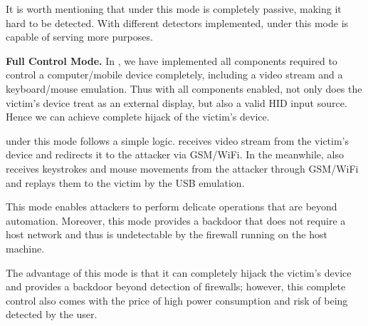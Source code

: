It is worth mentioning that \tool under this mode is completely passive, making
it hard to be detected. With different detectors implemented, \tool
under this mode is capable of serving more purposes.

\textbf{Full Control Mode.} In \tool, we have implemented all components
required to control a computer/mobile device completely, including a video stream
and a keyboard/mouse emulation. Thus with all components enabled, not only does
the victim's device treat \tool as an external display, but also a valid \ac{HID}
input source. Hence we can achieve complete hijack of the victim's device.

\tool under this mode follows a simple logic. \tool receives video stream
from the victim's device and redirects it to the attacker via GSM/WiFi. In the
meanwhile, \tool also receives keystrokes and mouse movements from the attacker
through GSM/WiFi and replays them to the victim by the \ac{USB} emulation.

This mode enables attackers to perform delicate operations that are beyond
automation. Moreover, this mode provides a backdoor that does not require a host
network and thus is undetectable by the firewall running on the host machine.

The advantage of this mode is that it can completely hijack the victim's device
and provides a backdoor beyond detection of firewalls; however, this complete control
also comes with the price of high power consumption and risk of being detected
by the user.

